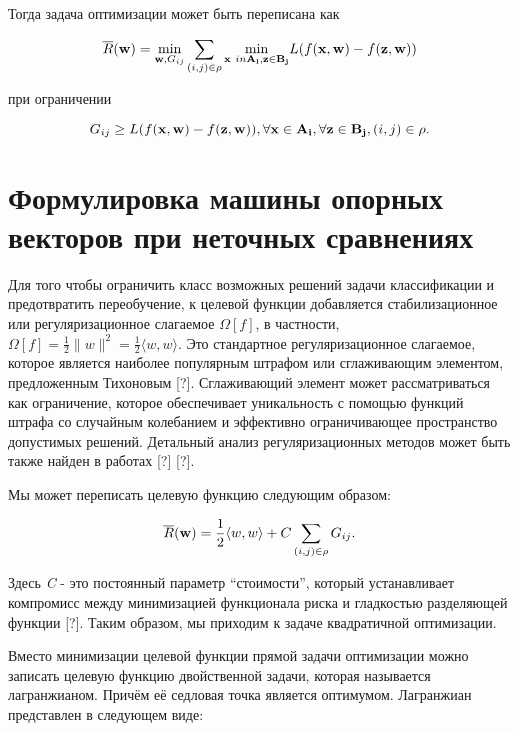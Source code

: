 \documentclass[12pt,a4paper,oneside]{article}
\begin{document}
\par
Тогда задача оптимизации может быть переписана как

\[
\overline{R}(\mathbf{w}) = \underset{\mathbf{w}, G_{ij}}{\operatorname{min}} \sum \limits_{(i, j) \in \mathrm{\rho}} \underset{\mathbf{x} \ in \mathbf{A_i}, \mathbf{z} \in \mathbf{B_j}}{\operatorname{min}} L ( f(\mathbf{x}, \mathbf{w}) - f(\mathbf{z}, \mathbf{w}))
\]

\par
при ограничении

\[
G_{ij} \geq L ( f(\mathbf{x}, \mathbf{w}) - f(\mathbf{z}, \mathbf{w})), \forall \mathbf{x} \in \mathbf{A_i}, \forall \mathbf{z} \in \mathbf{B_j}, (i, j) \in \mathrm{\rho}.
\]

\section{Формулировка машины опорных векторов при неточных сравнениях}
\label{sec:svm_by_imprecise_comparisons}

\par
Для того чтобы ограничить класс возможных решений задачи классификации и предотвратить переобучение, к целевой функции добавляется стабилизационное или регуляризационное слагаемое \(\Omega[f]\), в частности, \(\Omega[f] = \frac{1}{2}\|w\|^2 = \frac{1}{2} \langle w, w \rangle \). 
Это стандартное регуляризационное слагаемое, которое является наиболее популярным штрафом или сглаживающим элементом, предложенным Тихоновым [?]. 
Сглаживающий элемент может рассматриваться как ограничение, которое обеспечивает уникальность с помощью функций штрафа со случайным колебанием и эффективно ограничивающее пространство допустимых решений. 
Детальный анализ регуляризационных методов может быть также найден в работах [?] [?]. 

\par
Мы может переписать целевую функцию следующим образом:

\[
\overline{R}(\mathbf{w}) = \frac{1}{2} \langle w, w \rangle + C \sum \limits_{(i, j) \in \mathrm{\rho}} G_{ij}. 
\]

\par
Здесь \emph{C} - это постоянный параметр ``стоимости'', который устанавливает компромисс между минимизацией функционала риска и гладкостью разделяющей функции [?]. 
Таким образом, мы приходим к задаче квадратичной оптимизации. 

\par
Вместо минимизации целевой функции прямой задачи оптимизации можно записать целевую функцию двойственной задачи, которая называется лагранжианом. 
Причём её седловая точка является оптимумом. 
Лагранжиан представлен в следующем виде:
\end{document}
